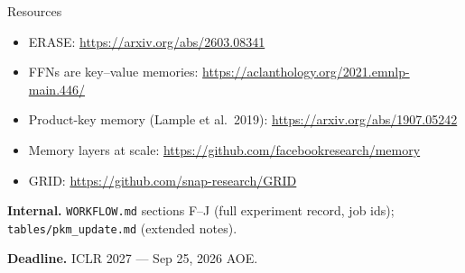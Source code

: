 \documentclass{beamer}
\begin{document}
\begin{frame}{Resources}
\begin{itemize}
  \item ERASE: \url{https://arxiv.org/abs/2603.08341}
  \item FFNs are key--value memories: \url{https://aclanthology.org/2021.emnlp-main.446/}
  \item Product-key memory (Lample et al.\ 2019): \url{https://arxiv.org/abs/1907.05242}
  \item Memory layers at scale: \url{https://github.com/facebookresearch/memory}
  \item GRID: \url{https://github.com/snap-research/GRID}
\end{itemize}

\medskip
\textbf{Internal.} \texttt{WORKFLOW.md} sections F--J (full experiment record,
job ids); \texttt{tables/pkm\_update.md} (extended notes).

\medskip
\textbf{Deadline.} ICLR 2027 --- Sep 25, 2026 AOE.
\end{frame}

\end{document}
